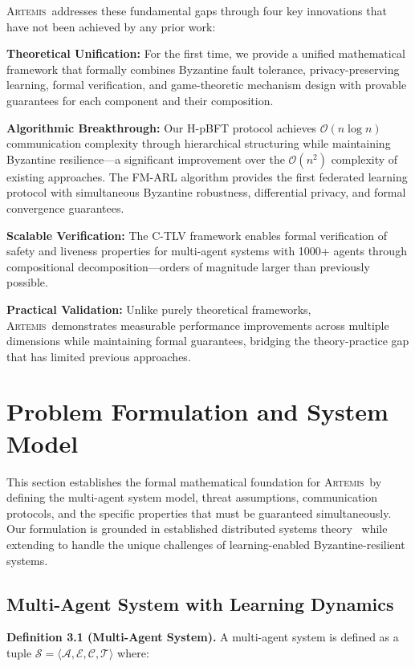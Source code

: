 \documentclass[conference]{IEEEtran}
\newcommand{\artemis}{\textsc{Artemis}}
\newcommand{\bigO}{\mathcal{O}}
\begin{document}
\artemis\ addresses these fundamental gaps through four key innovations that have not been achieved by any prior work:

\textbf{Theoretical Unification:} For the first time, we provide a unified mathematical framework that formally combines Byzantine fault tolerance, privacy-preserving learning, formal verification, and game-theoretic mechanism design with provable guarantees for each component and their composition.

\textbf{Algorithmic Breakthrough:} Our H-pBFT protocol achieves $\bigO(n \log n)$ communication complexity through hierarchical structuring while maintaining Byzantine resilience—a significant improvement over the $\bigO(n^2)$ complexity of existing approaches. The FM-ARL algorithm provides the first federated learning protocol with simultaneous Byzantine robustness, differential privacy, and formal convergence guarantees.

\textbf{Scalable Verification:} The C-TLV framework enables formal verification of safety and liveness properties for multi-agent systems with 1000+ agents through compositional decomposition—orders of magnitude larger than previously possible.

\textbf{Practical Validation:} Unlike purely theoretical frameworks, \artemis\ demonstrates measurable performance improvements across multiple dimensions while maintaining formal guarantees, bridging the theory-practice gap that has limited previous approaches.

\section{Problem Formulation and System Model}

This section establishes the formal mathematical foundation for \artemis\ by defining the multi-agent system model, threat assumptions, communication protocols, and the specific properties that must be guaranteed simultaneously. Our formulation is grounded in established distributed systems theory~\cite{lynch1996distributed} while extending to handle the unique challenges of learning-enabled Byzantine-resilient systems.

\subsection{Multi-Agent System with Learning Dynamics}

\textbf{Definition 3.1 (Multi-Agent System).} A multi-agent system is defined as a tuple $\mathcal{S} = \langle \mathcal{A}, \mathcal{E}, \mathcal{C}, \mathcal{T} \rangle$ where:
\end{document}
